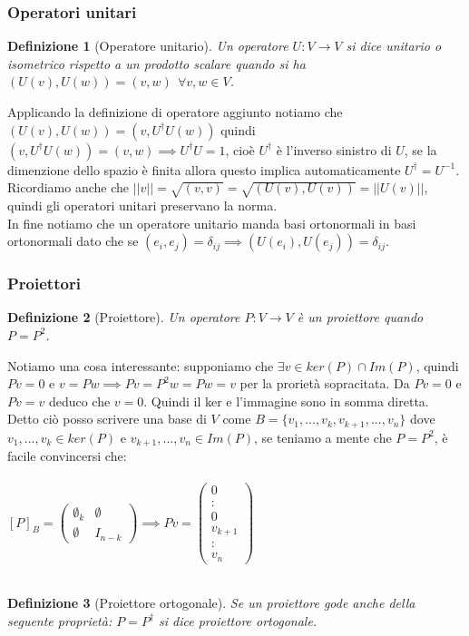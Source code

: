 \documentclass[a4paper,12pt]{report}
\newtheorem{definizione}{Definizione}[chapter]
\begin{document}
\subsubsection{Operatori unitari}

\begin{definizione}[Operatore unitario]
    Un operatore $U:V \to V$ si dice unitario o isometrico rispetto a un prodotto scalare quando si ha $(U(v),U(w))=(v,w) \ \ \forall v,w \in V$.
\end{definizione}

Applicando la definizione di operatore aggiunto notiamo che $(U(v),U(w))=(v,U^\dagger U(w))$ quindi $(v,U^\dagger U(w))=(v,w) \implies U^\dagger U=1$, cioè $U^\dagger$ è l'inverso sinistro di $U$, se la dimenzione dello spazio è finita allora questo implica automaticamente $U^\dagger=U^{-1}$.
\\Ricordiamo anche che $||v||=\sqrt{(v,v)}=\sqrt{(U(v),U(v))}=||U(v)||$, quindi gli operatori unitari preservano la norma.
\\In fine notiamo che un operatore unitario manda basi ortonormali in basi ortonormali dato che se $(e_i,e_j)=\delta _{ij} \implies (U(e_i),U(e_j))=\delta_{ij}$.

\newpage

\subsubsection{Proiettori}

\begin{definizione}[Proiettore]
    Un operatore $P:V \to V$ è un proiettore quando $P=P^2$.  
\end{definizione}

Notiamo una cosa interessante: supponiamo che $\exists v \in ker(P) \cap Im(P)$, quindi $Pv=0$ e $v=Pw \implies Pv=P^2w=Pw=v$ per la prorietà sopracitata. Da $Pv=0$ e $Pv=v$ deduco che $v=0$. Quindi il ker e l'immagine sono in somma diretta.
\\Detto ciò posso scrivere una base di $V$ come $B=\{v_1,...,v_k,v_{k+1},...,v_n\}$ dove $v_1,...,v_k \in ker(P)$ e $v_{k+1},...,v_n \in Im(P)$, se teniamo a mente che $P=P^2$, è facile convincersi che: 
\\
\\$[P]_B=\begin{pmatrix}
    \emptyset_k & \emptyset \\ 
    \emptyset & I_{n-k}
\end{pmatrix} \implies Pv=\begin{pmatrix}
    0\\:\\0\\v_{k+1}\\:\\v_n
\end{pmatrix}$
\\
\\ \begin{definizione}[Proiettore ortogonale]
    Se un proiettore gode anche della seguente proprietà: $P=P^\dagger$ si dice proiettore ortogonale.
\end{definizione}
\end{document}
